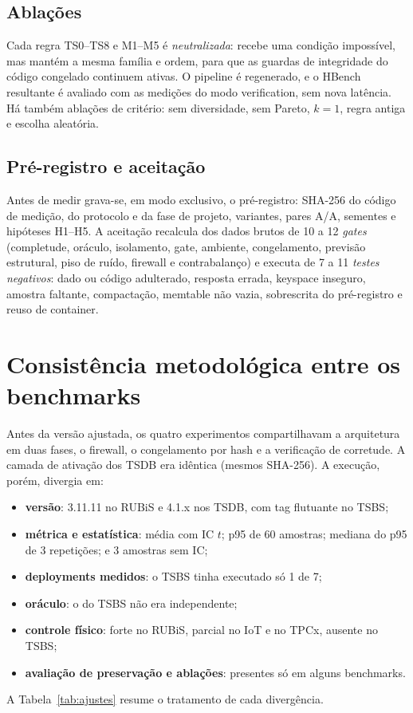 \documentclass[10pt,a4paper,twoside]{article}
\theoremstyle{definition}\newtheorem{definicao}{Definição}
\begin{document}
\subsection{Ablações}
Cada regra TS0--TS8 e M1--M5 é \emph{neutralizada}: recebe uma condição impossível, mas mantém a mesma família e ordem, para que as guardas de integridade do código congelado continuem ativas. O pipeline é regenerado, e o HBench resultante é avaliado com as medições do modo verification, sem nova latência. Há também ablações de critério: sem diversidade, sem Pareto, $k=1$, regra antiga e escolha aleatória.

\subsection{Pré-registro e aceitação}
Antes de medir grava-se, em modo exclusivo, o pré-registro: SHA-256 do código de medição, do protocolo e da fase de projeto, variantes, pares A/A, sementes e hipóteses H1--H5. A aceitação recalcula dos dados brutos de 10 a 12 \emph{gates} (completude, oráculo, isolamento, gate, ambiente, congelamento, previsão estrutural, piso de ruído, firewall e contrabalanço) e executa de 7 a 11 \emph{testes negativos}: dado ou código adulterado, resposta errada, keyspace inseguro, amostra faltante, compactação, memtable não vazia, sobrescrita do pré-registro e reuso de container.

\section{Consistência metodológica entre os benchmarks}\label{sec:consistencia}
Antes da versão ajustada, os quatro experimentos compartilhavam a arquitetura em duas fases, o firewall, o congelamento por hash e a verificação de corretude. A camada de ativação dos TSDB era idêntica (mesmos SHA-256). A execução, porém, divergia em:
\begin{itemize}
\item \textbf{versão}: 3.11.11 no RUBiS e 4.1.x nos TSDB, com tag flutuante no TSBS;
\item \textbf{métrica e estatística}: média com IC $t$; p95 de 60 amostras; mediana do p95 de 3 repetições; e 3 amostras sem IC;
\item \textbf{deployments medidos}: o TSBS tinha executado só 1 de 7;
\item \textbf{oráculo}: o do TSBS não era independente;
\item \textbf{controle físico}: forte no RUBiS, parcial no IoT e no TPCx, ausente no TSBS;
\item \textbf{avaliação de preservação e ablações}: presentes só em alguns benchmarks.
\end{itemize}
A Tabela~\ref{tab:ajustes} resume o tratamento de cada divergência.
\end{document}
